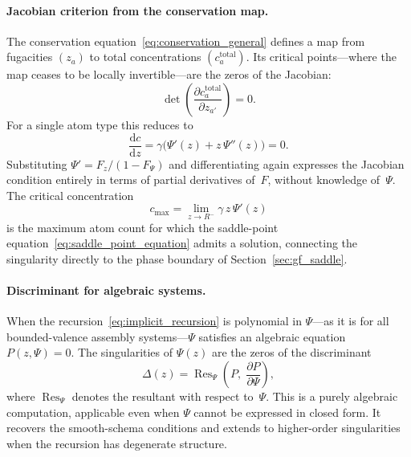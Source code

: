 \documentclass[11pt]{amsart}
\newcommand{\GFcomb}{\Psi}
\newcommand{\Deriv}[2]{\frac{\mathrm{d}#1}{\mathrm{d}#2}}
\newcommand{\PDeriv}[2]{\frac{\partial #1}{\partial #2}}
\theoremstyle{definition}
\theoremstyle{plain}
\theoremstyle{remark}
\begin{document}
\paragraph{Jacobian criterion from the conservation map.}
The conservation equation~\eqref{eq:conservation_general} defines a map from fugacities $(z_a)$ to total concentrations $(c_a^{\mathrm{total}})$.
Its critical points---where the map ceases to be locally invertible---are the zeros of the Jacobian:
\begin{equation}\label{eq:jacobian_criterion}
\det\!\left(\PDeriv{c_a^{\mathrm{total}}}{z_{a'}}\right) = 0.
\end{equation}
For a single atom type this reduces to
\[
\Deriv{c}{z} = \gamma\bigl(\GFcomb'(z) + z\,\GFcomb''(z)\bigr) = 0.
\]
Substituting $\GFcomb' = F_z/(1-F_{\GFcomb})$ and differentiating again expresses the Jacobian condition entirely in terms of partial derivatives of~$F$, without knowledge of~$\GFcomb$.
The critical concentration
\begin{equation}\label{eq:critical_concentration}
c_{\max} = \lim_{z\to R^-}\gamma\,z\,\GFcomb'(z)
\end{equation}
is the maximum atom count for which the saddle-point equation~\eqref{eq:saddle_point_equation} admits a solution, connecting the singularity directly to the phase boundary of Section~\ref{sec:gf_saddle}.

\paragraph{Discriminant for algebraic systems.}
When the recursion~\eqref{eq:implicit_recursion} is polynomial in $\GFcomb$---as it is for all bounded-valence assembly systems---$\GFcomb$ satisfies an algebraic equation $P(z,\GFcomb)=0$.
The singularities of $\GFcomb(z)$ are the zeros of the discriminant
\begin{equation}\label{eq:discriminant}
\Delta(z) = \operatorname{Res}_{\GFcomb}\!\left(P,\;\PDeriv{P}{\GFcomb}\right),
\end{equation}
where $\operatorname{Res}_{\GFcomb}$ denotes the resultant with respect to~$\GFcomb$.
This is a purely algebraic computation, applicable even when $\GFcomb$ cannot be expressed in closed form.
It recovers the smooth-schema conditions and extends to higher-order singularities when the recursion has degenerate structure.
\end{document}
